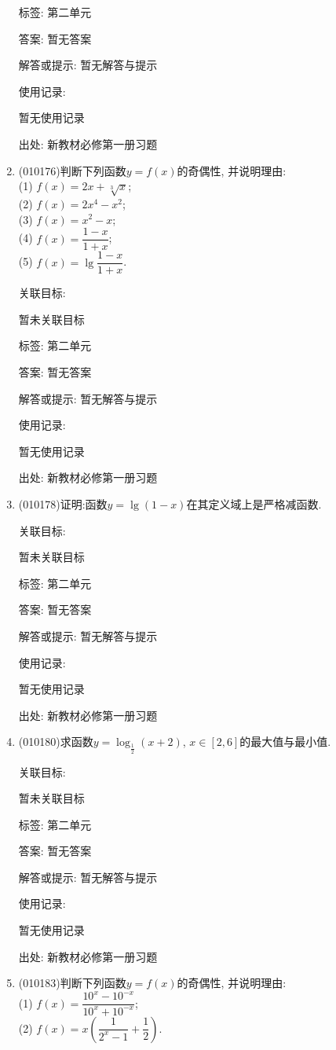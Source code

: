 \documentclass[10pt,a4paper]{article}
\begin{document}
\begin{enumerate}[1.]
标签: 第二单元

答案: 暂无答案

解答或提示: 暂无解答与提示

使用记录:

暂无使用记录


出处: 新教材必修第一册习题
\item { (010176)}判断下列函数$y=f(x)$的奇偶性, 并说明理由:\\
(1) $f(x)=2x+\sqrt[3]x$;\\
(2) $f(x)=2x^4-x^2$;\\
(3) $f(x)=x^2-x$;\\
(4) $f(x)=\dfrac{1-x}{1+x}$;\\
(5) $f(x)=\lg\dfrac {1-x}{1+x}$.


关联目标:

暂未关联目标



标签: 第二单元

答案: 暂无答案

解答或提示: 暂无解答与提示

使用记录:

暂无使用记录


出处: 新教材必修第一册习题
\item { (010178)}证明:函数$y=\lg (1-x)$在其定义域上是严格减函数.


关联目标:

暂未关联目标



标签: 第二单元

答案: 暂无答案

解答或提示: 暂无解答与提示

使用记录:

暂无使用记录


出处: 新教材必修第一册习题
\item { (010180)}求函数$y=\log_{\frac 12}(x+2)$, $x\in [2, 6]$的最大值与最小值.


关联目标:

暂未关联目标



标签: 第二单元

答案: 暂无答案

解答或提示: 暂无解答与提示

使用记录:

暂无使用记录


出处: 新教材必修第一册习题
\item { (010183)}判断下列函数$y=f(x)$的奇偶性, 并说明理由:\\
(1) $f(x)=\dfrac{10^x-10^{-x}}{10^x+10^{-x}}$;\\
(2) $f(x)=x(\dfrac 1{2^x-1}+\dfrac 12)$.



\end{enumerate}
\end{document}
